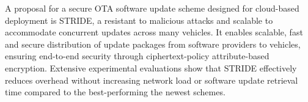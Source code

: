 A proposal for a secure OTA software update scheme designed for cloud-based deployment is STRIDE, a resistant to malicious attacks and scalable to accommodate concurrent updates across many vehicles.
It enables scalable, fast and secure distribution of update packages from software providers to vehicles, ensuring end-to-end security through ciphertext-policy attribute-based encryption.
Extensive experimental evaluations show that STRIDE effectively reduces overhead without increasing network load or software update retrieval time compared to the best-performing the newest schemes\cite{sota}.
